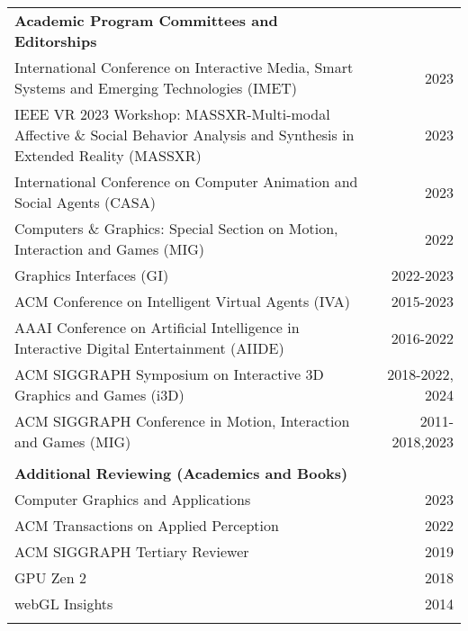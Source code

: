 \begin{tabular*}{7.1in}{@{}l@{\extracolsep\fill}r}
{\bf Academic Program Committees and Editorships} & \\
International Conference on Interactive Media, Smart Systems and Emerging Technologies (IMET)& 2023\\
IEEE VR 2023 Workshop: MASSXR-Multi-modal Affective \& Social Behavior Analysis and Synthesis in Extended Reality (MASSXR)& 2023\\
International Conference on Computer Animation and Social Agents (CASA)& 2023 \\
Computers \& Graphics: Special Section on Motion, Interaction and Games (MIG)& 2022 \\
Graphics Interfaces (GI)& 2022-2023 \\
ACM Conference on Intelligent Virtual Agents (IVA)& 2015-2023\\
AAAI Conference on Artificial Intelligence in Interactive Digital Entertainment (AIIDE)& 2016-2022 \\
ACM SIGGRAPH Symposium on Interactive 3D Graphics and Games (i3D)& 2018-2022, 2024 \\
ACM SIGGRAPH Conference in Motion, Interaction and Games (MIG)& 2011-2018,2023 \\
\phantom{yommomma} & \phantom{2002}\\

{\bf Additional Reviewing (Academics and Books)} & \\
Computer Graphics and Applications & 2023 \\
ACM Transactions on Applied Perception & 2022 \\
ACM SIGGRAPH Tertiary Reviewer & 2019 \\
GPU Zen 2 & 2018 \\
webGL Insights & 2014 \\
\phantom{yommomma} & \phantom{2002}\\

\end{tabular*}


